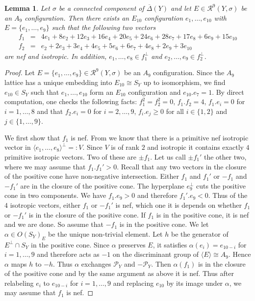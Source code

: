 \documentclass[a4paper]{amsart}
\theoremstyle{definition}
\theoremstyle{plain}
\newtheorem{lemma}[definition]{Lemma}
\renewcommand{\P}{\mathcal{P}}
\newcommand{\R}{\mathcal{R}}
\newcommand{\DeltabarY}{\overline{\Delta}(Y)}
\begin{document}
\begin{lemma}\label{A9:helper}
Let $\sigma$ be a connected component of $\DeltabarY$ and let $E \in \R^9(Y,\sigma)$ be an $A_9$ configuration. Then there exists an $E_{10}$ configuration $e_1,\dots, e_{10}$
with $E=\{e_1,\dots, e_9\}$ such that the following two vectors
\begin{eqnarray*}
f_1 &=& 4e_1   +8e_2   +12e_3   +16e_4   +20e_5   +24e_6   +28e_7   +17e_8   +6e_9   +15e_{10}  \\
f_2 &=& e_2 +2 e_3 + 3 e_4 +4 e_5+ 5e_6+ 6e_7+ 4 e_8 + 2e_9 +3 e_{10}
\end{eqnarray*}
are nef and isotropic.
In addition, $e_1,\dots, e_8 \in f_1^\perp$ and $e_2,\dots, e_9 \in f_2^\perp$.
\end{lemma}
\begin{proof}
Let $E=\{e_1,\dots, e_9\} \in \R^9(Y,\sigma)$ be an $A_9$ configuration. Since the $A_9$ lattice has a unique embedding into $E_{10}\cong S_Y$ up to isomorphism, we find $e_{10} \in S_Y$ such that $e_1,\dots, e_{10}$ form an $E_{10}$ configuration and $e_{10}.e_7=1$. 
By direct computation, one checks the following facts:
$f_1^2=f_2^2=0$, $f_1.f_2=4$, $f_1.e_i=0$ for $i=1,\dots,8$ and that $f_2.e_i=0$ for $i=2,\dots,9$, $f_i.e_j\geq 0$ for all $i \in \{1,2\}$ and $j \in \{1,\dots, 9\}$.

We first show that $f_1$ is nef.
From  we know that there is a primitive nef isotropic vector in $\langle e_1,\dots,e_8\rangle^\perp=:V$. Since $V$ is of rank $2$ and isotropic it contains exactly $4$ primitive isotropic vectors. Two of these are $\pm f_1$. Let us call $\pm f_1'$ the other two, where we may assume that $f_1.f_1'>0$. 
Recall that any two vectors in the closure of the positive cone have non-negative intersection. Either $f_1$ and $f_1'$  or $-f_1$ and $-f_1'$ are in the closure of the positive cone. The hyperplane $e_9^\perp$ cuts the positive cone in two components. We have $f_1.e_9>0$ and therefore $f_1'.e_9<0$. Thus of the $4$ isotropic vectors, either $f_1$ or $-f_1'$ is nef, which one it is depends on whether $f_1$ or $-f_1'$ is in the closure of the positive cone. If $f_1$ is in the positive cone, it is nef and we are done. 
So assume that $-f_1$ is in the positive cone. We let $\alpha \in O(S_Y)_{E}$ be the unique non-trivial element. Let $h$ be the generator of $E^\perp\cap S_Y$ in the positive cone. Since $\alpha$ preserves $E$, it satisfies $\alpha(e_i)=e_{10-i}$ for $i=1,\dots,9$ and therefore acts as $-1$ on the discriminant group of $\langle E \rangle \cong A_9$. Hence $\alpha$ maps $h$ to $-h$. Thus $\alpha$ exchanges $\P_Y$ and $-\P_Y$. Then $\alpha(f_1)$ is in the closure of the positive cone and by the same argument as above it is nef. Thus after relabeling $e_i$ to $e_{10-i}$ for $i=1,\dots,9$ and replacing $e_{10}$ by its image under $\alpha$, we may assume that $f_1$ is nef. 


\end{proof}
\end{document}
